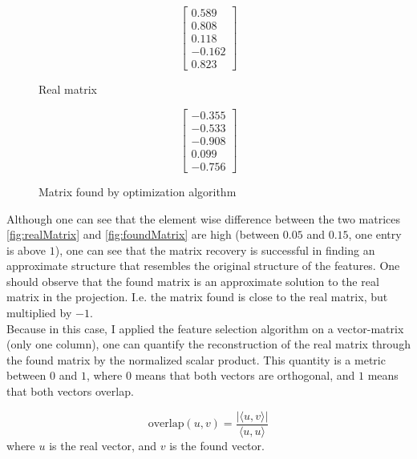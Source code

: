 \def\realW{
\begin{bmatrix}
	0.589 \\
    0.808 \\
	0.118 \\
	-0.162 \\
	0.823
\end{bmatrix}}

\def\okW1{
\begin{bmatrix}
	-0.355 \\
    	-0.533 \\
    	-0.908 \\
    	0.099 \\
    -0.756 
\end{bmatrix}}

\begin{figure}[h] 
\begin {minipage}{0.47\textwidth}
  \centering
  \begin{equation} \label{fig:realMatrix}
    \realW
  \end{equation}
  \caption{Real matrix}
\end{minipage}
\hfill
\begin {minipage}{0.47\textwidth}
  \centering
  \begin{equation} \label{fig:foundMatrix}
    \okW1
  \end{equation}
  \caption{Matrix found by optimization algorithm}
\end{minipage}
\end{figure}

Although one can see that the element wise difference between the two matrices \ref{fig:realMatrix} and \ref{fig:foundMatrix} are high (between $0.05$ and $0.15$, one entry is above $1$), one can see that the matrix recovery is successful in finding an approximate structure that resembles the original structure of the features.
One should observe that the found matrix is an approximate solution to the real matrix in the projection. I.e. the matrix found is close to the real matrix, but multiplied by $-1$. \\

Because in this case, I applied the feature selection algorithm on a vector-matrix (only one column), one can quantify the reconstruction of the real matrix through the found matrix by the normalized scalar product.
This quantity is a metric between $0$ and $1$, where $0$ means that both vectors are orthogonal, and $1$ means that both vectors overlap.

\begin{equation}
\text{overlap}(u, v) = \frac{| \langle u, v \rangle |}{\langle u, u \rangle}
\end{equation}
where $u$ is the real vector, and $v$ is the found vector.

